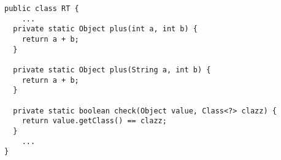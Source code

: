 {\tiny \begin{verbatim}
public class RT {
    ...
  private static Object plus(int a, int b) {
    return a + b;
  }

  private static Object plus(String a, int b) {
    return a + b;
  }

  private static boolean check(Object value, Class<?> clazz) {
    return value.getClass() == clazz;
  }
    ...
}
\end{verbatim} }
